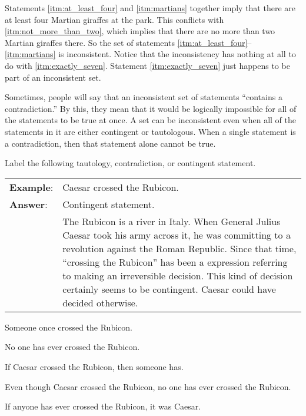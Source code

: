 Statements \ref{itm:at_least_four} and \ref{itm:martians} together imply that there are at least four Martian giraffes at the park. This conflicts with \ref{itm:not_more_than_two}, which implies that there are no more than two Martian giraffes there. So the set of statements \ref{itm:at_least_four}--\ref{itm:martians} is inconsistent. Notice that the inconsistency has nothing at all to do with \ref{itm:exactly_seven}. Statement \ref{itm:exactly_seven} just happens to be part of an inconsistent set.

Sometimes, people will say that an inconsistent set of statements ``contains a contradiction.'' By this, they mean that it would be logically impossible for all of the statements to be true at once. A set can be inconsistent even when all of the statements in it are either contingent or tautologous. When a single statement is a contradiction, then that statement alone cannot be true.



\practiceproblems
\noindent \problempart \label{pr.EnglishTautology} Label the following tautology, contradiction, or contingent statement.

\begin{longtabu}{p{.1\linewidth}p{.9\linewidth}}
\textbf{Example}: & Caesar crossed the Rubicon. \\
\textbf{Answer}: & Contingent statement. \\
&The Rubicon is a river in Italy. When General Julius Caesar took his army across it, he was committing to a revolution against the Roman Republic. Since that time, ``crossing the Rubicon'' has been a expression referring to making an irreversible decision. This kind of decision certainly seems to be contingent. Caesar could have decided otherwise.\\
\end{longtabu}

\begin{exercises}
\item Someone once crossed the Rubicon. 

\item No one has ever crossed the Rubicon. 

\item If Caesar crossed the Rubicon, then someone has. 

\item Even though Caesar crossed the Rubicon, no one has ever crossed the Rubicon. 

\item If anyone has ever crossed the Rubicon, it was Caesar. 
\end{exercises}


